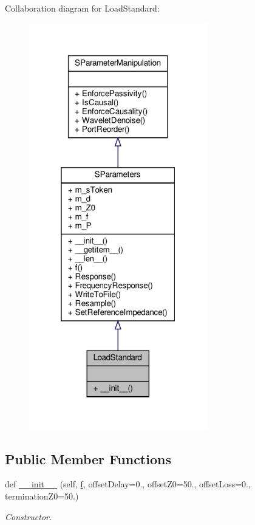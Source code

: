 Collaboration diagram for Load\+Standard\+:
\nopagebreak
\begin{figure}[H]
\begin{center}
\leavevmode
\includegraphics[width=220pt]{classSignalIntegrity_1_1Measurement_1_1CalKit_1_1Standards_1_1LoadStandard_1_1LoadStandard__coll__graph}
\end{center}
\end{figure}
\subsection*{Public Member Functions}
\begin{DoxyCompactItemize}
\item 
def \hyperlink{classSignalIntegrity_1_1Measurement_1_1CalKit_1_1Standards_1_1LoadStandard_1_1LoadStandard_a4b50935dab0ed4c6d020795e45433a5c}{\+\_\+\+\_\+init\+\_\+\+\_\+} (self, \hyperlink{classSignalIntegrity_1_1SParameters_1_1SParameters_1_1SParameters_a32e7a34d6837fe949b413c852a0447f8}{f}, offset\+Delay=0., offset\+Z0=50., offset\+Loss=0., termination\+Z0=50.)
\begin{DoxyCompactList}\small\item\em Constructor. \end{DoxyCompactList}\end{DoxyCompactItemize}


